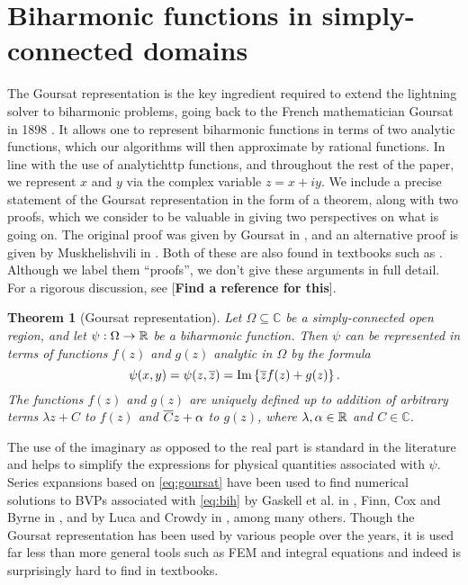 \newtheorem{theorem}{Theorem}

\section{Biharmonic functions in simply-connected domains \label{sec:goursat}}

The Goursat representation is the key ingredient required to extend the lightning solver to biharmonic problems, going back to the French mathematician Goursat in 1898 \cite{goursat98}. It allows one to represent biharmonic functions in terms of two analytic functions, which our algorithms will then approximate by rational functions. In line with the use of analytichttp functions, and throughout the rest of the paper, we represent $x$ and $y$ via the complex variable $z = x + iy$. We include a precise statement of the Goursat representation in the form of a theorem, along with two proofs, which we consider to be valuable in giving two perspectives on what is going on. The original proof was given by Goursat in \cite{goursat98}, and an alternative proof is given by Muskhelishvili in \cite{musk19}. Both of these are also found in textbooks such as \cite{carrier05,musk77}. Although we label them ``proofs'', we don’t give these arguments in full detail. For a rigorous discussion, see [\textbf{Find a reference for this}].


\begin{theorem}[Goursat representation]
\label{th:goursat}
Let $\Omega\subseteq\mathbb{C}$ be a simply-connected open region, and let
$\psi : \Omega \rightarrow \mathbb{R}$ be a biharmonic function. Then $\psi$ can be represented in terms of functions $f(z)$ and $g(z)$ analytic in $\Omega$ by the formula
\begin{equation}\label{eq:goursat}
\psi(x,y) = \psi(z,{\overline{z}}) = \Im \left\{ {\overline{z}}f(z) + g(z)\right\}.
\end{equation}
The functions $f(z)$ and $g(z)$ are uniquely defined up to addition of arbitrary terms $\lambda z+C$ to $f(z)$ and ${\overline{C}}z+\alpha$ to $g(z)$, where $\lambda,\alpha\in\mathbb{R}$ and $C\in\mathbb{C}$.
\end{theorem}

The use of the imaginary as opposed to the real part is standard in the literature and helps
to simplify the expressions for physical quantities associated with $\psi$. Series expansions based on
\eqref{eq:goursat} have been used to find numerical solutions to BVPs associated with \eqref{eq:bih} by Gaskell et al. in
\cite{gaskell98}, Finn, Cox and Byrne in \cite{finn03}, and by Luca and Crowdy in \cite{luca18}, among many others. Though
the Goursat representation has been used by various people over the years, it is used far less than more general tools such as FEM and integral equations and indeed is surprisingly hard to find in textbooks.



